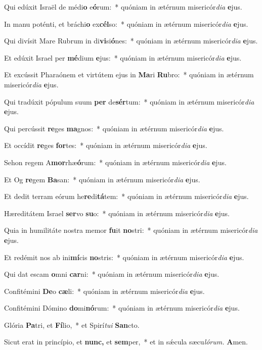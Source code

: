 \item Qui edúxit Israël de médi\textbf{o} e\textbf{ó}rum:~* quóniam in ætérnum misericór\textit{dia} \textbf{e}jus.
\item In manu poténti, et bráchi\textbf{o} ex\textbf{cél}so:~* quóniam in ætérnum misericór\textit{dia} \textbf{e}jus.
\item Qui divísit Mare Rubrum in di\textbf{vi}si\textbf{ó}nes:~* quóniam in ætérnum misericór\textit{dia} \textbf{e}jus.
\item Et edúxit Israel per \textbf{mé}dium \textbf{e}jus:~* quóniam in ætérnum misericór\textit{dia} \textbf{e}jus.
\item Et excússit Pharaónem et virtútem ejus in \textbf{Ma}ri \textbf{Ru}bro:~* quóniam in ætérnum misericór\textit{dia} \textbf{e}jus.
\item Qui tradúxit pópulum suum \textbf{per} de\textbf{sér}tum:~* quóniam in ætérnum misericór\textit{dia} \textbf{e}jus.
\item Qui percússit \textbf{re}ges \textbf{ma}gnos:~* quóniam in ætérnum misericór\textit{dia} \textbf{e}jus.
\item Et occídit \textbf{re}ges \textbf{for}tes:~* quóniam in ætérnum misericór\textit{dia} \textbf{e}jus.
\item Sehon regem A\textbf{mor}rhæ\textbf{ó}rum:~* quóniam in ætérnum misericór\textit{dia} \textbf{e}jus.
\item Et Og \textbf{re}gem \textbf{Ba}san:~* quóniam in ætérnum misericór\textit{dia} \textbf{e}jus.
\item Et dedit terram eórum he\textbf{re}di\textbf{tá}tem:~* quóniam in ætérnum misericór\textit{dia} \textbf{e}jus.
\item Hæreditátem Israel \textbf{ser}vo \textbf{su}o:~* quóniam in ætérnum misericór\textit{dia} \textbf{e}jus.
\item Quia in humilitáte nostra memor \textbf{fu}it \textbf{no}stri:~* quóniam in ætérnum misericór\textit{dia} \textbf{e}jus.
\item Et redémit nos ab ini\textbf{mí}cis \textbf{no}stris:~* quóniam in ætérnum misericór\textit{dia} \textbf{e}jus.
\item Qui dat escam \textbf{o}mni \textbf{car}ni:~* quóniam in ætérnum misericór\textit{dia} \textbf{e}jus.
\item Confitémini \textbf{De}o \textbf{cæ}li:~* quóniam in ætérnum misericór\textit{dia} \textbf{e}jus.
\item Confitémini Dómino \textbf{do}mi\textbf{nó}rum:~* quóniam in ætérnum misericór\textit{dia} \textbf{e}jus.
\item Glória \textbf{Pa}tri, et \textbf{Fí}lio,~* et Spirí\hspace{0.03em}\textit{tui} \textbf{San}cto.
\item Sicut erat in princípio, et \textbf{nunc,} et \textbf{sem}per,~* et in sǽcula sæcu\hspace{0.03em}\textit{lórum.} \textbf{A}men.